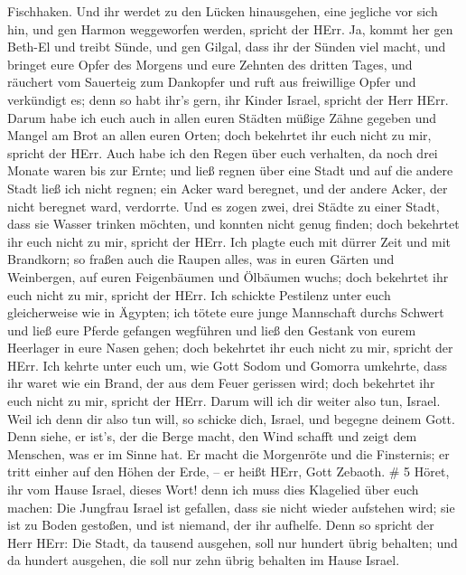 Fischhaken.  Und ihr werdet zu den Lücken hinausgehen, eine
jegliche vor sich hin, und gen Harmon weggeworfen werden, spricht der
HErr.  Ja, kommt her gen Beth-El und treibt Sünde, und gen
Gilgal, dass ihr der Sünden viel macht, und bringet eure Opfer des
Morgens und eure Zehnten des dritten Tages,  und räuchert
vom Sauerteig zum Dankopfer und ruft aus freiwillige Opfer und
verkündigt es; denn so habt ihr's gern, ihr Kinder Israel, spricht der
Herr HErr.  Darum habe ich euch auch in allen euren Städten
müßige Zähne gegeben und Mangel am Brot an allen euren Orten; doch
bekehrtet ihr euch nicht zu mir, spricht der HErr.  Auch
habe ich den Regen über euch verhalten, da noch drei Monate waren bis
zur Ernte; und ließ regnen über eine Stadt und auf die andere Stadt ließ
ich nicht regnen; ein Acker ward beregnet, und der andere Acker, der
nicht beregnet ward, verdorrte.  Und es zogen zwei, drei
Städte zu einer Stadt, dass sie Wasser trinken möchten, und konnten
nicht genug finden; doch bekehrtet ihr euch nicht zu mir, spricht der
HErr.  Ich plagte euch mit dürrer Zeit und mit Brandkorn; so
fraßen auch die Raupen alles, was in euren Gärten und Weinbergen, auf
euren Feigenbäumen und Ölbäumen wuchs; doch bekehrtet ihr euch nicht zu
mir, spricht der HErr.  Ich schickte Pestilenz unter euch
gleicherweise wie in Ägypten; ich tötete eure junge Mannschaft durchs
Schwert und ließ eure Pferde gefangen wegführen und ließ den Gestank von
eurem Heerlager in eure Nasen gehen; doch bekehrtet ihr euch nicht zu
mir, spricht der HErr.  Ich kehrte unter euch um, wie Gott
Sodom und Gomorra umkehrte, dass ihr waret wie ein Brand, der aus dem
Feuer gerissen wird; doch bekehrtet ihr euch nicht zu mir, spricht der
HErr.  Darum will ich dir weiter also tun, Israel. Weil ich
denn dir also tun will, so schicke dich, Israel, und begegne deinem
Gott.  Denn siehe, er ist's, der die Berge macht, den Wind
schafft und zeigt dem Menschen, was er im Sinne hat. Er macht die
Morgenröte und die Finsternis; er tritt einher auf den Höhen der Erde,
-- er heißt HErr, Gott Zebaoth. \# 5  Höret, ihr vom Hause
Israel, dieses Wort! denn ich muss dies Klagelied über euch machen:
 Die Jungfrau Israel ist gefallen, dass sie nicht wieder
aufstehen wird; sie ist zu Boden gestoßen, und ist niemand, der ihr
aufhelfe.  Denn so spricht der Herr HErr: Die Stadt, da
tausend ausgehen, soll nur hundert übrig behalten; und da hundert
ausgehen, die soll nur zehn übrig behalten im Hause Israel. 
